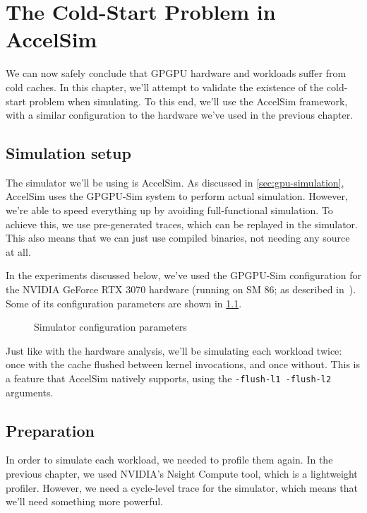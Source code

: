 \chapter{The Cold-Start Problem in AccelSim}\label{ch:sim-analysis}

We can now safely conclude that GPGPU hardware and workloads suffer from cold caches.
In this chapter, we'll attempt to validate the existence of the cold-start problem when simulating.
To this end, we'll use the AccelSim framework, with a similar configuration to the hardware we've used in the previous chapter.

\section{Simulation setup}\label{sec:simulation-setup}
The simulator we'll be using is AccelSim\cite{accelsim}.
As discussed in \cref{sec:gpu-simulation}, AccelSim uses the GPGPU-Sim\cite{gpgpu-sim} system to perform actual simulation.
However, we're able to speed everything up by avoiding full-functional simulation.
To achieve this, we use pre-generated traces, which can be replayed in the simulator.
This also means that we can just use compiled binaries, not needing any source at all.

In the experiments discussed below, we've used the GPGPU-Sim configuration for the NVIDIA GeForce RTX 3070 hardware (running on SM 86; as described in\ \cite{nvidia-wp}).
Some of its configuration parameters are shown in \cref{fig:sim_config}.

\begin{figure}[ht]
    \centering
    
    \caption{Simulator configuration parameters}
    \label{fig:sim_config}
\end{figure}

Just like with the hardware analysis, we'll be simulating each workload twice: once with the cache flushed between kernel invocations, and once without.
This is a feature that AccelSim natively supports, using the \verb|-flush-l1 -flush-l2| arguments.

\FloatBarrier
\section{Preparation}\label{sec:preparation}
In order to simulate each workload, we needed to profile them again.
In the previous chapter, we used NVIDIA's Nsight Compute tool, which is a lightweight profiler.
However, we need a cycle-level trace for the simulator, which means that we'll need something more powerful.

